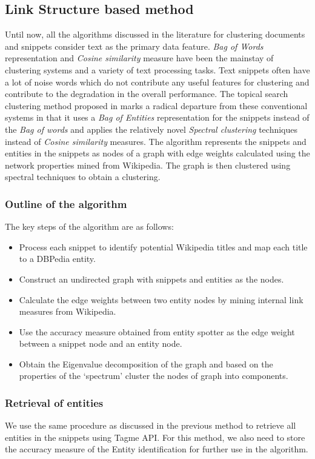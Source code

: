 \documentclass[a4paper,12pt]{report}
\begin{document}
\subsection{Link Structure based method}
Until now, all the algorithms discussed in the literature for
clustering documents and snippets consider text as the primary data
feature.  {\it Bag of Words} representation and {\it Cosine
  similarity} measure have been the mainstay of clustering systems and
a variety of text processing tasks. Text snippets often have a lot of
noise words which do not contribute any useful features for clustering
and contribute to the degradation in the overall performance. The
topical search clustering method proposed in \cite{Ferragina} marks a
radical departure from these conventional systems in that it uses a
{\it Bag of Entities} representation for the snippets instead of the
{\it Bag of words} and applies the relatively novel {\it Spectral
  clustering} techniques instead of {\it Cosine similarity}
measures. The algorithm represents the snippets and entities in the
snippets as nodes of a graph with edge weights calculated using the
network properties mined from Wikipedia. The graph is then clustered
using spectral techniques to obtain a clustering.

\subsubsection{Outline of the algorithm}
The key steps of the algorithm are as follows:
\begin{itemize}
  \item Process each snippet to identify potential Wikipedia titles
    and map each title to a DBPedia entity.
  \item Construct an undirected graph with snippets and entities as
    the nodes.
  \item Calculate the edge weights between two entity nodes by mining
    internal link measures from Wikipedia.
  \item Use the accuracy measure obtained from entity spotter as the
    edge weight between a snippet node and an entity node.
  \item Obtain the Eigenvalue decomposition of the graph and based on
    the properties of the `spectrum' cluster the nodes of graph into
    components.
\end{itemize}

\subsubsection{Retrieval of entities}
We use the same procedure as discussed in the previous method to
retrieve all entities in the snippets using Tagme API. For this
method, we also need to store the accuracy measure of the Entity
identification for further use in the algorithm.
\end{document}
